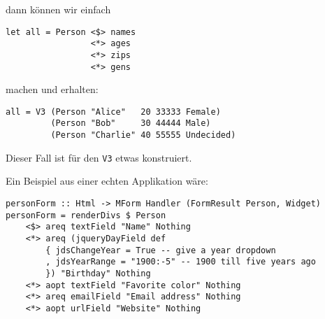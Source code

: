 \documentclass{beamer}
\begin{document}
\begin{frame}[fragile]
dann können wir einfach
\begin{verbatim}
let all = Person <$> names
                 <*> ages
                 <*> zips
                 <*> gens
\end{verbatim}
machen \pause und erhalten:
\begin{verbatim}
all = V3 (Person "Alice"   20 33333 Female)
         (Person "Bob"     30 44444 Male)
         (Person "Charlie" 40 55555 Undecided)
\end{verbatim}

\end{frame}


\begin{frame}[fragile]
Dieser Fall ist für den \texttt{V3} etwas konstruiert.\\\par
\pause
Ein Beispiel aus einer echten Applikation wäre:
\begin{verbatim}
personForm :: Html -> MForm Handler (FormResult Person, Widget)
personForm = renderDivs $ Person
    <$> areq textField "Name" Nothing
    <*> areq (jqueryDayField def
        { jdsChangeYear = True -- give a year dropdown
        , jdsYearRange = "1900:-5" -- 1900 till five years ago
        }) "Birthday" Nothing
    <*> aopt textField "Favorite color" Nothing
    <*> areq emailField "Email address" Nothing
    <*> aopt urlField "Website" Nothing
\end{verbatim}
\end{frame}
\end{document}

